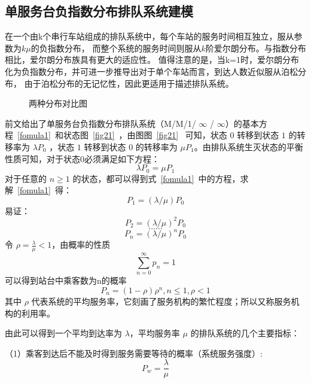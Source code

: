 \subsection{单服务台负指数分布排队系统建模}
在一个由k个串行车站组成的排队系统中，每个车站的服务时间相互独立，服从参数为$k\mu$的负指数分布，
而整个系统的服务时间则服从$k$阶爱尔朗分布。与指数分布相比，爱尔朗分布族具有更大的适应性。
值得注意的是，当k=1时，爱尔朗分布化为负指数分布，并可进一步推导出对于单个车站而言，到达人数近似服从泊松分布，
由于泊松分布的无记忆性\cite{gll}，因此更适用于描述排队系统。
\\
\begin{figure}[htbp!]
    \centering
    \caption{两种分布对比图}
    \label{dis1}
\end{figure}

前文给出了单服务台负指数分布排队系统（M/M/1/ $\infty $ / $\infty $）的基本方程~\ref{fomula1}~和状态图~\ref{fig21}~，由图图~\ref{fig21}~
可知，状态 $0$ 转移到状态 $1$ 的转移率为 $\lambda P_0$ ，状态 $1$ 转移到状态 $0$ 的转移率为 $\mu P_1$。由排队系统生灭状态的平衡性质可知，对于状态0必须满足如下方程：
$$\lambda P_0 = \mu P_1$$
对于任意的 $n \ge 1$ 的状态，都可以得到式~\ref{fomula1}~中的方程，求解~\ref{fomula1}~得：
$$P_1 = (\lambda / \mu)P_0$$
易证：
$$P_2 = \left(\lambda / \mu \right)^2 P_0$$
$$……$$
$$P_n = \left(\lambda / \mu \right)^n P_0$$
令 $\rho = \frac{\lambda}{\mu} < 1$，由概率的性质
$$\sum_{n=0}^{\infty}p_n = 1$$ 可以得到站台中乘客数为n的概率 $$P_n = (1-\rho)\rho^n, n \le 1, \rho < 1$$
其中 $\rho$ 代表系统的平均服务率，它刻画了服务机构的繁忙程度；所以又称服务机构的利用率。

由此可以得到一个平均到达率为 $\lambda$，平均服务率 $\mu$ 的排队系统的几个主要指标：

（1）乘客到达后不能及时得到服务需要等待的概率（系统服务强度）:
\begin{equation}\label{fomula31}
    P_w = \frac{\lambda}{\mu}
\end{equation}

